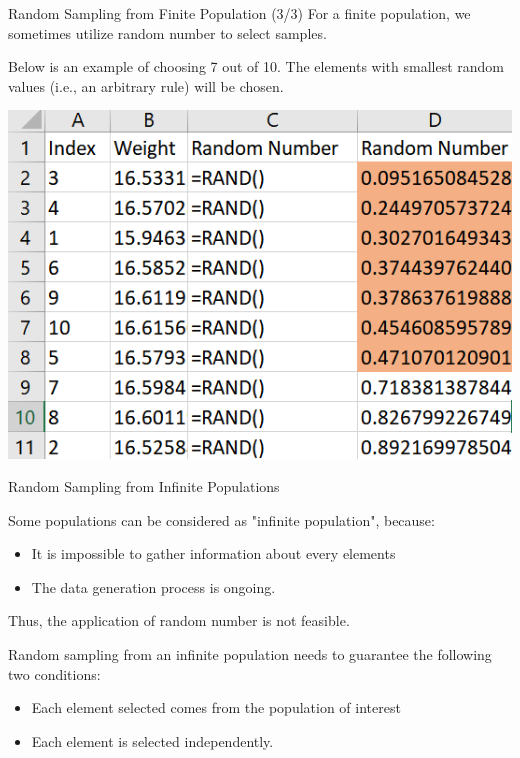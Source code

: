 \documentclass{beamer}
\begin{document}
\begin{frame}{Random Sampling from Finite Population (3/3)}
For a finite population, we sometimes utilize random number to select samples. 

\vspace{0.3 cm}
Below is an example of choosing 7 out of 10. The elements with smallest random values (i.e., an arbitrary rule) will be chosen. 

\begin{center}
\includegraphics[scale=0.4]{images/section5RandomNumber.png}
\end{center}


\end{frame}




\begin{frame}{Random Sampling from Infinite Populations}

Some populations can be considered as "infinite population", because:
\begin{itemize}
\item It is impossible to gather information about every elements
\item The data generation process is ongoing. 
\end{itemize}
Thus, the application of random number is not feasible.

\vspace{0.3 cm}
Random sampling from an infinite population needs to guarantee the following two conditions: 
\begin{itemize}
\item Each element selected comes from the population of interest
\item Each element is selected independently. 
\end{itemize}

\end{frame}
\end{document}
